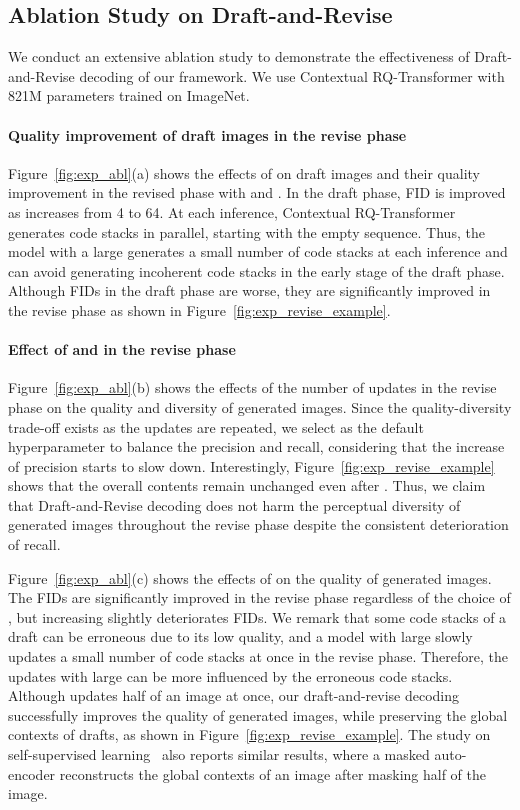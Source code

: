 \documentclass{article}
\newcommand{\ARmodel}{Contextual RQ-Transformer }
\begin{document}
\subsection{Ablation Study on Draft-and-Revise} \label{sec:exp_abl}
We conduct an extensive ablation study to demonstrate the effectiveness of Draft-and-Revise decoding of our framework. We use \ARmodel with 821M parameters trained on ImageNet.


\paragraph{Quality improvement of draft images in the revise phase}
Figure~\ref{fig:exp_abl}(a) shows the effects of  on draft images and their quality improvement in the revised phase with   and .
In the draft phase, FID is improved as  increases from 4 to 64.
At each inference, \ARmodel generates  code stacks in parallel, starting with the empty sequence.
Thus, the model with a large  generates a small number of code stacks at each inference and can avoid generating incoherent code stacks in the early stage of the draft phase.
Although FIDs in the draft phase are worse, they are significantly improved in the revise phase as shown in Figure~\ref{fig:exp_revise_example}.






\paragraph{Effect of  and  in the revise phase} 
Figure~\ref{fig:exp_abl}(b) shows the effects of the number of updates  in the revise phase on the quality and diversity of generated images.
Since the quality-diversity trade-off exists as the updates are repeated, we select  as the default hyperparameter to balance the precision and recall, considering that the increase of precision starts to slow down.
Interestingly, Figure~\ref{fig:exp_revise_example} shows that the overall contents remain unchanged even after .
Thus, we claim that Draft-and-Revise decoding does not harm the perceptual diversity of generated images throughout the revise phase despite the consistent deterioration of recall.

Figure~\ref{fig:exp_abl}(c) shows the effects of  on the quality of generated images.
The FIDs are significantly improved in the revise phase regardless of the choice of , but increasing  slightly deteriorates FIDs.
We remark that some code stacks of a draft can be erroneous due to its low quality, and a model with large  slowly updates a small number of code stacks at once in the revise phase.  
Therefore, the updates with large  can be more influenced by the erroneous code stacks.
Although  updates half of an image at once, our draft-and-revise decoding successfully improves the quality of generated images, while preserving the global contexts of drafts, as shown in Figure~\ref{fig:exp_revise_example}.
The study on self-supervised learning~\cite{MAE} also reports similar results, where a masked auto-encoder reconstructs the global contexts of an image after masking half of the image.
\end{document}
